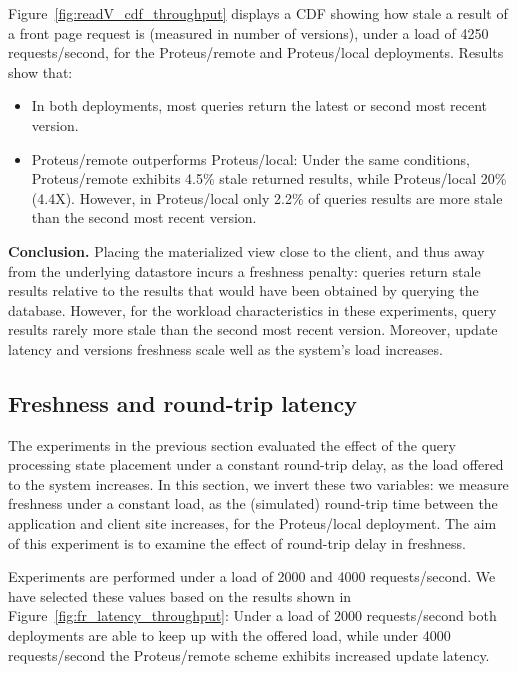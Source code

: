Figure~\ref{fig:readV_cdf_throughput} displays a CDF showing how stale a result of a front page request is
(measured in number of versions),
under a load of 4250 requests/second, for the Proteus/remote and Proteus/local deployments.
Results show that:
\begin{itemize}
  \item In both deployments, most queries return the latest or second most recent version.
  \item Proteus/remote outperforms Proteus/local:
  Under the same conditions, Proteus/remote exhibits 4.5\% stale returned results,
  while Proteus/local 20\% (4.4X).
  However, in Proteus/local only 2.2\% of queries results are more stale than the second most recent version.
\end{itemize}

\medskip
\noindent
\textbf{Conclusion.}
Placing the materialized view close to the client, and thus away from the underlying datastore incurs a freshness penalty:
queries return stale results relative to the results that would have been obtained by querying the database.
However, for the workload characteristics in these experiments,
query results rarely more stale than the second most recent version.
Moreover, update latency and versions freshness scale well as the system's load increases.


\subsection{Freshness and round-trip latency}
\label{sec:eval_freshness_rtt}

The experiments in the previous section evaluated the effect of the query processing state placement under a constant
round-trip delay, as the load offered to the system increases.
In this section, we invert these two variables:
we measure freshness under a constant load,
as the (simulated) round-trip time between the application and client site increases,
for the Proteus/local deployment.
The aim of this experiment is to examine the effect of round-trip delay in freshness.

Experiments are performed under a load of 2000 and 4000 requests/second.
We have selected these values based on the results shown in Figure~\ref{fig:fr_latency_throughput}:
Under a load of 2000 requests/second both deployments are able to keep up with the offered load,
while under 4000 requests/second the Proteus/remote scheme exhibits increased update latency.

